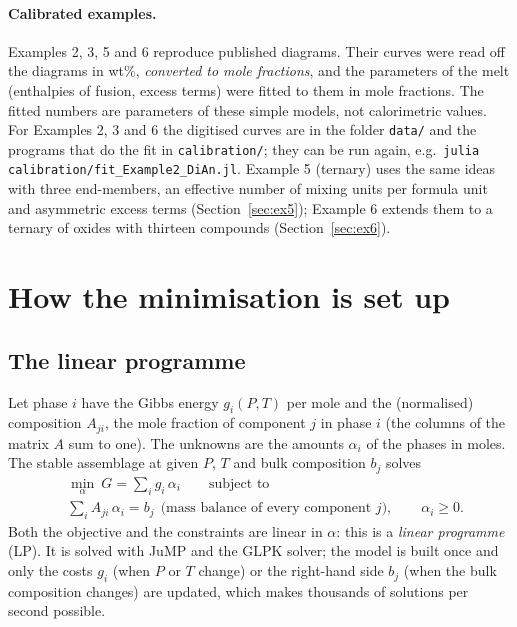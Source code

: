 \documentclass[11pt,a4paper]{article}
\newcommand{\file}[1]{\texttt{#1}}
\begin{document}
\paragraph{Calibrated examples.} Examples 2, 3, 5 and 6 reproduce published diagrams. Their curves were read off
the diagrams in wt\%, \emph{converted to mole fractions}, and the parameters of the melt (enthalpies of fusion,
excess terms) were fitted to them in mole fractions. The fitted numbers are parameters of these simple models,
not calorimetric values. For Examples 2, 3 and 6 the digitised curves are in the folder \file{data/} and the
programs that do the fit in \file{calibration/}; they can be run again, e.g.\
\lstinline{julia calibration/fit_Example2_DiAn.jl}. Example 5 (ternary) uses the same ideas with three
end-members, an effective number of mixing units per formula unit and asymmetric excess terms
(Section~\ref{sec:ex5}); Example 6 extends them to a ternary of oxides with thirteen compounds
(Section~\ref{sec:ex6}).

\section{How the minimisation is set up}\label{sec:lp}

\subsection{The linear programme}
Let phase $i$ have the Gibbs energy $g_i(P,T)$ per mole and the (normalised) composition $A_{ji}$, the mole
fraction of component $j$ in phase $i$ (the columns of the matrix $A$ sum to one). The unknowns are the
amounts $\alpha_i$ of the phases in moles. The stable assemblage at given $P$, $T$ and bulk composition $b_j$ solves
\begin{equation}\label{eq:lp}
\begin{aligned}
  &\min_{\alpha}\ G = \sum_i g_i\,\alpha_i \qquad \text{subject to}\\
  &\sum_i A_{ji}\,\alpha_i = b_j \ \ \text{(mass balance of every component $j$)},\qquad \alpha_i \ge 0 .
\end{aligned}
\end{equation}
Both the objective and the constraints are linear in $\alpha$: this is a \emph{linear programme} (LP). It is
solved with JuMP and the GLPK solver; the model is built once and only the costs $g_i$ (when $P$ or $T$
change) or the right-hand side $b_j$ (when the bulk composition changes) are updated, which makes thousands of
solutions per second possible.
\end{document}
